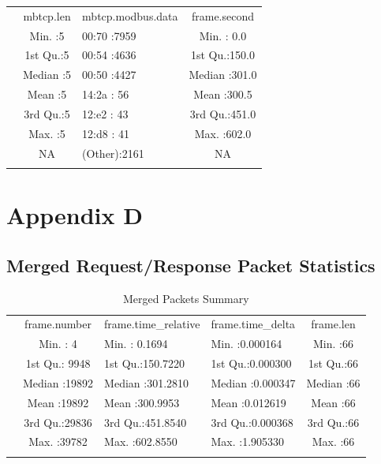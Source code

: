 \documentclass[11pt,]{article}
\begin{document}
\begin{longtable}[c]{@{}lclc@{}}
\toprule\addlinespace
& mbtcp.len & mbtcp.modbus.data & frame.second
\\\addlinespace
\midrule\endhead
& Min. :5 & 00:70 :7959 & Min. : 0.0
\\\addlinespace
& 1st Qu.:5 & 00:54 :4636 & 1st Qu.:150.0
\\\addlinespace
& Median :5 & 00:50 :4427 & Median :301.0
\\\addlinespace
& Mean :5 & 14:2a : 56 & Mean :300.5
\\\addlinespace
& 3rd Qu.:5 & 12:e2 : 43 & 3rd Qu.:451.0
\\\addlinespace
& Max. :5 & 12:d8 : 41 & Max. :602.0
\\\addlinespace
& NA & (Other):2161 & NA
\\\addlinespace
\bottomrule
\end{longtable}

\clearpage

\section*{Appendix D}\label{appendix-d}

\subsection*{Merged Request/Response Packet
Statistics}\label{merged-requestresponse-packet-statistics}

\begin{longtable}[c]{@{}lcllc@{}}
\toprule\addlinespace
& frame.number & frame.time\_relative & frame.time\_delta & frame.len
\\\addlinespace
\midrule\endhead
& Min. : 4 & Min. : 0.1694 & Min. :0.000164 & Min. :66
\\\addlinespace
& 1st Qu.: 9948 & 1st Qu.:150.7220 & 1st Qu.:0.000300 & 1st Qu.:66
\\\addlinespace
& Median :19892 & Median :301.2810 & Median :0.000347 & Median :66
\\\addlinespace
& Mean :19892 & Mean :300.9953 & Mean :0.012619 & Mean :66
\\\addlinespace
& 3rd Qu.:29836 & 3rd Qu.:451.8540 & 3rd Qu.:0.000368 & 3rd Qu.:66
\\\addlinespace
& Max. :39782 & Max. :602.8550 & Max. :1.905330 & Max. :66
\\\addlinespace
\bottomrule
\addlinespace
\caption{Merged Packets Summary}
\end{longtable}
\end{document}
